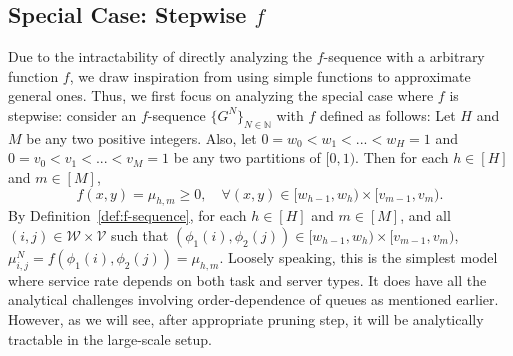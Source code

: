\documentclass[11pt, reqno]{article}
\numberwithin{equation}{section}
\numberwithin{theorem}{section}
\newcommand{\N}{\mathbb{N}}                 %
\begin{document}
\subsection{Special Case: Stepwise $f$}\label{sec:stepwise-f}
Due to the intractability of directly analyzing the $f$-sequence with a arbitrary function $f$, we draw inspiration from using simple functions to approximate general ones. Thus, we first focus on analyzing the special case where $f$ is stepwise: 
consider an $f$-sequence $\{G^N\}_{N\in\N}$ with $f$ defined as follows:
Let $H$ and $M$ be any two positive integers. 
Also, let
$0=w_0<w_1<...<w_H=1$ and $0=v_0<v_1<...<v_M=1$ be any two partitions of $[0,1)$.
Then for each $h\in[H]$ and $m\in[M]$,
\begin{equation}\label{eq:f-step}
    f(x,y)=\mu_{h,m}\geq 0,\quad \forall (x,y)\in[w_{h-1},w_h)\times[v_{m-1},v_m).
\end{equation}
By Definition~\ref{def:f-sequence}, for each $h\in[H]$ and $m\in[M]$, and all $(i,j)\in\mathcal{W}\times \mathcal{V}$ such that $(\phi_1(i),\phi_2(j))\in [w_{h-1},w_h)\times [v_{m-1},v_m)$, $\mu^N_{i,j}=f(\phi_1(i),\phi_2(j))=\mu_{h,m}.$
Loosely speaking, this is the simplest model where service rate depends on both task and server types.
It does have all the analytical challenges involving order-dependence of queues as mentioned earlier. 
However, as we will see, after appropriate pruning step, it will be analytically tractable in the large-scale setup.
\end{document}
